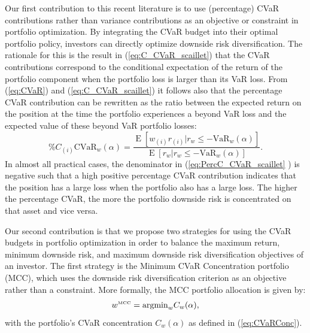 \documentclass[12pt,a4paper]{article}
\DeclareMathOperator{\E}{\operatorname{E}}
\newcommand{\argmin}{{\operatorname{argmin}}}
\begin{document}
Our first contribution to this recent literature is to use (percentage) CVaR contributions rather than variance contributions as an objective or constraint in portfolio optimization. By integrating the CVaR budget into their optimal portfolio policy, investors can directly optimize downside risk diversification. The rationale for this is the result in (\ref{eq:C_CVaR_scaillet}) that the CVaR contributions correspond to the conditional expectation of the return of the portfolio component when the portfolio loss is larger than its VaR loss. From (\ref{eq:CVaR}) and (\ref{eq:C_CVaR_scaillet}) it follows also that the percentage CVaR contribution can be rewritten as the ratio between the expected return on the position at the time the portfolio experiences a beyond VaR loss and the expected value of these beyond VaR portfolio losses:
 \begin{equation} \%C_{(i)}\mbox{CVaR}_w(\alpha) = \frac{ \E[w_{(i)}r_{(i)} | r_w \leq -\mbox{VaR}_w(\alpha)] }{\E[r_w | r_w \leq -\mbox{VaR}_w(\alpha)]}. \label{eq:PercC_CVaR_scaillet} \end{equation}
In almost all practical cases, the denominator in (\ref{eq:PercC_CVaR_scaillet} ) is negative such that a high positive percentage CVaR contribution indicates that the position has a large loss when the portfolio also has a large loss. The higher the percentage CVaR, the more the portfolio downside risk is concentrated on that asset and vice versa.

 Our second contribution is that we propose two strategies for using the CVaR budgets in portfolio optimization in order to balance the maximum return, minimum downside risk, and maximum downside risk diversification objectives of an investor. The first strategy is the Minimum CVaR Concentration portfolio (MCC), which uses the downside risk diversification criterion as an objective rather than a constraint. More formally, the MCC portfolio allocation is given by:
\begin{equation}  w^{\mbox{\tiny MCC}} = \argmin_w C_w(\alpha) , \label{eq:MCCportfolio} \end{equation}
with the portfolio's CVaR concentration $C_w(\alpha)$ as defined in (\ref{eq:CVaRConc}).
\end{document}
